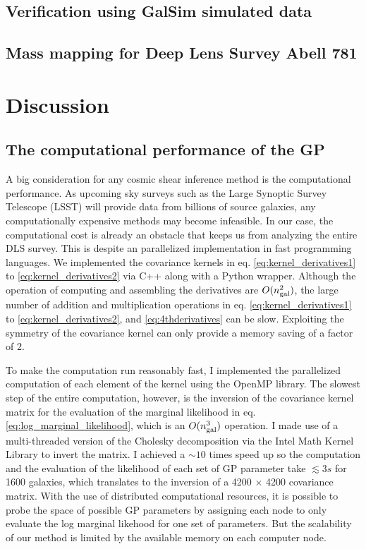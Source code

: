 \subsection{Verification using {\sc GalSim} simulated data}
\subsection{Mass mapping for Deep Lens Survey Abell 781}


\section{Discussion}

\subsection{The computational performance of the GP}
A big consideration for any cosmic shear inference method is the computational performance.
As upcoming sky surveys such as the Large Synoptic Survey Telescope (LSST) will
provide data from billions of source galaxies, any
computationally expensive methods may become infeasible. 
In our case, the computational cost is already an obstacle that keeps us from
analyzing the entire DLS survey. This is despite an parallelized implementation
in fast programming languages.   
We implemented the covariance kernels in eq. \ref{eq:kernel_derivatives1} to
\ref{eq:kernel_derivatives2}
via {\sc C++} along with a {\sc Python} wrapper. 
Although the operation of computing and assembling the
derivatives are $O(n_{\rm gal}^2)$, the large number of addition and 
multiplication operations in eq. \ref{eq:kernel_derivatives1} to
\ref{eq:kernel_derivatives2}, and \ref{eq:4thderivatives} can be slow.
Exploiting the symmetry of the covariance kernel can only provide 
a memory saving of a factor of 2.

To make the computation run reasonably fast, 
I implemented the parallelized computation of each element of the kernel using 
the {\sc OpenMP} library. The slowest step of the entire computation, however, 
is the inversion of the
covariance kernel matrix for the evaluation of the marginal likelihood in eq.
\ref{eq:log_marginal_likelihood}, 
which is an $O(n_{\rm gal}^3)$ operation. 
I made use of a multi-threaded version of the Cholesky decomposition via the {\sc Intel Math
Kernel Library} to invert the matrix. I achieved a $\sim10$ 
times speed up so the computation and the evaluation of the likelihood of each set of GP parameter
take $\lesssim 3s$ for 1600 galaxies, which translates to 
the inversion of a 4200 $\times$ 4200 covariance matrix.
With the use of distributed computational resources, it is possible 
to probe the space of possible GP parameters by assigning each node to only
evaluate the log marginal likehood for one set of parameters. 
But the scalability of our method is limited by the available memory on each
computer node.

